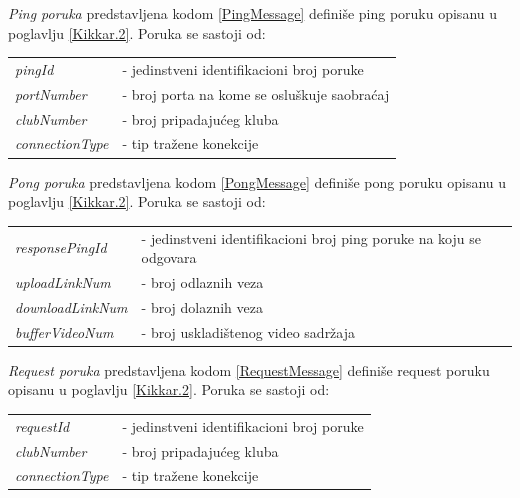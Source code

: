 \documentclass[12pt,oneside]{memoir}
\begin{document}


\textit{Ping poruka} predstavljena kodom \ref{PingMessage} definiše ping poruku opisanu u poglavlju \ref{Kikkar.2}. Poruka se sastoji od:
 
\begin{center}
\begin{tabular}{ p{4cm} p{10cm} }
 \textit{pingId} & - jedinstveni identifikacioni broj poruke \\ 
 \textit{portNumber} & - broj porta na kome se osluškuje saobraćaj \\  
 \textit{clubNumber} & - broj pripadajućeg kluba \\
 \textit{connectionType} & - tip  tražene konekcije \\
\end{tabular}
\end{center}




\textit{Pong poruka} predstavljena kodom \ref{PongMessage} definiše pong poruku opisanu u poglavlju \ref{Kikkar.2}. Poruka se sastoji od:
 
\begin{center}
\begin{tabular}{ p{4cm} p{10cm} }
 \textit{responsePingId} & - jedinstveni identifikacioni broj ping poruke na koju se odgovara \\ 
 \textit{uploadLinkNum} & - broj odlaznih veza \\  
 \textit{downloadLinkNum} & - broj dolaznih veza \\
 \textit{bufferVideoNum} & - broj uskladištenog video sadržaja \\
\end{tabular}
\end{center}




\textit{Request poruka} predstavljena kodom \ref{RequestMessage} definiše request poruku opisanu u poglavlju \ref{Kikkar.2}. Poruka se sastoji od:
 
\begin{center}
\begin{tabular}{ p{4cm} p{10cm} }
 \textit{requestId} & - jedinstveni identifikacioni broj poruke \\ 
 \textit{clubNumber} & - broj pripadajućeg kluba \\  
 \textit{connectionType} & - tip  tražene konekcije \\
\end{tabular}
\end{center}
\end{document}
